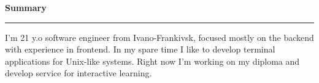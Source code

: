 {
    {\vspace{1cm} \hspace{-1cm} \Large \textbf{Summary}}
    \par\noindent\rule{\textwidth}{0.1mm}

    {\vspace{0.5cm}}
    I'm 21 y.o software engineer from Ivano-Frankivsk, focused mostly on the backend with experience in frontend.
    In my spare time I like to develop terminal applications for Unix-like systems.
    Right now I'm working on my diploma and develop service for interactive learning.
    \bigbreak
}